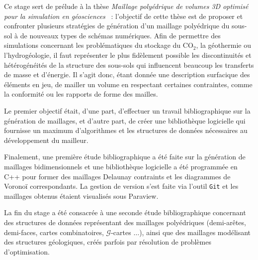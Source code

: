 \documentclass[12pt]{article}
\begin{document}
\resume

Ce stage sert de prélude à la thèse \og \emph{Maillage polyédrique de volumes 3D optimisé pour la simulation en géosciences} \fg{}~: l'objectif de cette thèse est de proposer et confronter plusieurs stratégies de génération d'un maillage polyédrique du sous-sol à de nouveaux types de schémas numériques. Afin de permettre des simulations concernant les problématiques du stockage du CO$_2$, la géothermie ou l'hydrogéologie, il faut représenter le plus fidèlement possible les discontinuités et hétérogénéités de la structure des sous-sols qui influencent beaucoup les transferts de masse et d'énergie. Il s'agit donc, étant donnée une description surfacique des éléments en jeu, de mailler un volume en respectant certaines contraintes, comme la conformité ou les rapports de forme des mailles.
\vspace{1cm}

Le premier objectif était, d'une part, d'effectuer un travail bibliographique sur la génération de maillages, et d'autre part, de créer une bibliothèque logicielle qui fournisse un maximum d'algorithmes et les structures de données nécessaires au développement du mailleur.

\vspace{1cm}

Finalement, une première étude bibliographique a été faite sur la génération de maillages bidimensionnels et une bibliothèque logicielle a été programmée en C++ pour former des maillages Delaunay contraints et les diagrammes de Voronoï correspondants. La gestion de version s'est faite via l'outil \verb+Git+ et les maillages obtenus étaient visualisés sous Paraview.

\vspace{1cm}
La fin du stage a été consacrée à une seconde étude bibliographique concernant des structures de données représentant des maillages polyédriques (demi-arêtes, demi-faces, cartes combinatoires, $\mathcal{G}$-cartes $\dots$), ainsi que des maillages modélisant des structures géologiques, créés parfois par résolution de problèmes d'optimisation.
\end{document}

